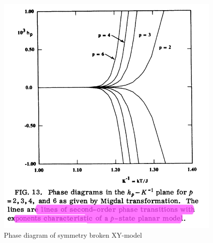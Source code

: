 	\begin{figure}
		\centering
		\includegraphics[width=0.8\linewidth]{graphics/Phase-Diagram-XY.png}
		\caption{Phase diagram of symmetry broken XY-model}
		\label{PhaseXY}
	\end{figure}
